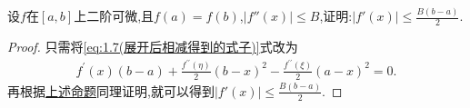 \documentclass[lang=cn,newtx,10pt,scheme=chinese]{../Template/elegantbook}
\begin{document}
\begin{corollary}\label{pro:一阶导数可被二阶导数和原函数控制(端点函数值相同的情形)}
    设\(f\)在\([a,b]\)上二阶可微,且\(f(a)=f(b)\),\(\vert f''(x)\vert\leqslant B\),证明:\(\vert f'(x)\vert\leqslant\frac{B\left( b-a \right)}{2}\).
\end{corollary}
\begin{proof}
    只需将\eqref{eq:1.7(展开后相减得到的式子)}式改为
    \begin{align*}
        f^{\prime}(x)(b-a)+\frac{f^{\prime\prime}(\eta )}{2}(b-x)^2-\frac{f^{\prime\prime}(\xi )}{2}(a-x)^2=0.
    \end{align*}
    再根据\hyperref[pro:一阶导数可被二阶导数和原函数控制]{上述命题}同理证明,就可以得到\(\vert f'(x)\vert\leqslant\frac{B\left( b-a \right)}{2}\).

\end{proof}
\end{document}
